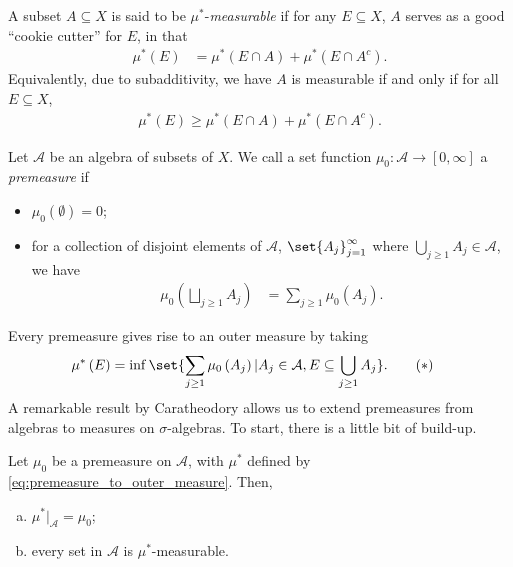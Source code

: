 \documentclass[10pt]{mypackage}
\begin{document}
\begin{definition}
  A subset $A\subseteq X$ is said to be $\mu^{\ast}$-\textit{measurable} if for any $E\subseteq X$, $A$ serves as a good ``cookie cutter'' for $E$, in that
  \begin{align*}
    \mu^{\ast}\left( E \right) &= \mu^{\ast}\left( E\cap A \right) + \mu^{\ast}\left( E\cap A^{c} \right).
  \end{align*}
  Equivalently, due to subadditivity, we have $A$ is measurable if and only if for all $E\subseteq X$,
  \begin{align*}
    \mu^{\ast}\left( E \right)\geq \mu^{\ast}\left( E\cap A \right) + \mu^{\ast}\left( E\cap A^{c} \right).
  \end{align*}
\end{definition}
\begin{definition}
  Let $\mathcal{A}$ be an algebra of subsets of $X$. We call a set function $\mu_0\colon \mathcal{A}\rightarrow [0,\infty]$ a \textit{premeasure} if
  \begin{itemize}
    \item $\mu_0\left( \emptyset \right) = 0$;
    \item for a collection of disjoint elements of $\mathcal{A}$, $\set{A_j}_{j=1}^{\infty}$ where $\bigcup_{j\geq 1}A_j\in \mathcal{A}$, we have
      \begin{align*}
        \mu_0\left( \bigsqcup_{j\geq 1}A_j \right) &= \sum_{j\geq 1}\mu_0\left( A_j \right).
      \end{align*}
  \end{itemize}
\end{definition}
Every premeasure gives rise to an outer measure by taking
\begin{align*}
  \mu^{\ast}\left( E \right) &= \inf\set{\sum_{j\geq 1}\mu_0\left( A_j \right) | A_j\in \mathcal{A},E\subseteq \bigcup_{j\geq 1}A_j}.\label{eq:premeasure_to_outer_measure}\tag{$\ast$}
\end{align*}
A remarkable result by Caratheodory allows us to extend premeasures from algebras to measures on $\sigma$-algebras. To start, there is a little bit of build-up.
\begin{proposition}
  Let $\mu_0$ be a premeasure on $\mathcal{A}$, with $\mu^{\ast}$ defined by \eqref{eq:premeasure_to_outer_measure}. Then,
  \begin{enumerate}[(a)]
    \item $\mu^{\ast}|_{\mathcal{A}} = \mu_0$;
    \item every set in $\mathcal{A}$ is $\mu^{\ast}$-measurable.
  \end{enumerate}
\end{proposition}
\end{document}
